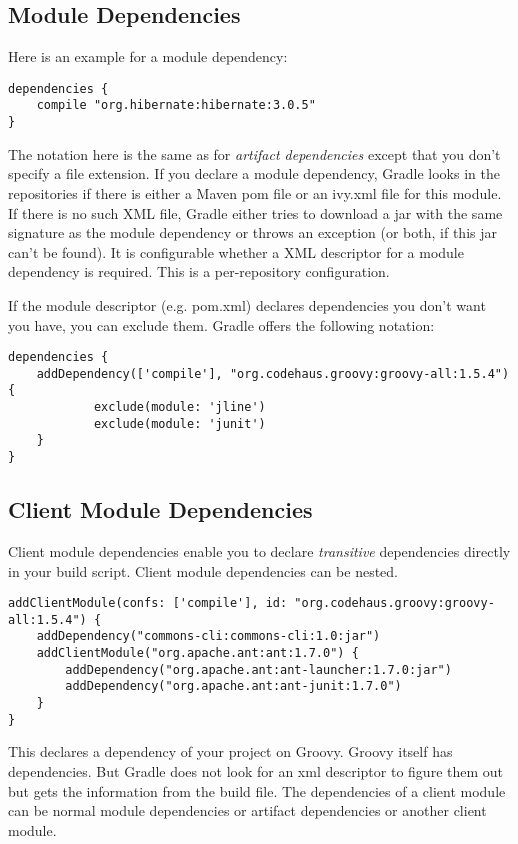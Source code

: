 \subsection{Module Dependencies} %
\label{sub:module_dependencies}
Here is an example for a module dependency:
\begin{Verbatim}
dependencies {
	compile "org.hibernate:hibernate:3.0.5"
}
\end{Verbatim}
The notation here is the same as for \emph{artifact dependencies} except that you don't specify a file extension. If you declare a module dependency, Gradle looks in the repositories if there is either a Maven pom file or an ivy.xml file for this module. If there is no such XML file, Gradle either tries to download a jar with the same signature as the module dependency or throws an exception (or both, if this jar can't be found). It is configurable whether a XML descriptor for a module dependency is required. This is a per-repository configuration.

If the module descriptor (e.g. pom.xml) declares dependencies you don't want you have, you can exclude them. Gradle offers the following notation:
\begin{Verbatim}
dependencies {
	addDependency(['compile'], "org.codehaus.groovy:groovy-all:1.5.4") {
	        exclude(module: 'jline')
	        exclude(module: 'junit')
	}
}
\end{Verbatim}

\subsection{Client Module Dependencies} %
\label{sub:client_module_dependencies}
Client module dependencies enable you to declare \emph{transitive} dependencies directly in your build script. Client module dependencies can be nested.
\begin{Verbatim}
addClientModule(confs: ['compile'], id: "org.codehaus.groovy:groovy-all:1.5.4") {
    addDependency("commons-cli:commons-cli:1.0:jar")
    addClientModule("org.apache.ant:ant:1.7.0") {
        addDependency("org.apache.ant:ant-launcher:1.7.0:jar")
        addDependency("org.apache.ant:ant-junit:1.7.0")
    }
}
\end{Verbatim}
This declares a dependency of your project on Groovy. Groovy itself has dependencies. But Gradle does not look for an xml descriptor to figure them out but gets the information from the build file. The dependencies of a client module can be normal module dependencies or artifact dependencies or another client module. 

